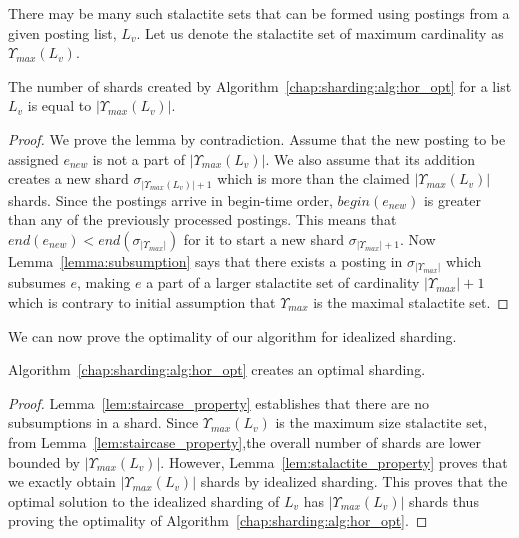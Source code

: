 There may be many such stalactite sets that can be formed using postings from a given posting list, $L_{v}$. Let us denote the stalactite set of maximum cardinality as $\Upsilon_{max}(L_{v})$.

\begin{lemma}
	\label{lem:stalactite_property}
			The number of shards created by Algorithm~\ref{chap:sharding:alg:hor_opt} for a list $L_v$ is equal to $|\Upsilon_{max}(L_v)|$.
\end{lemma}

\begin{proof}{} We prove the lemma by contradiction. Assume that the new posting to be assigned $e_{new}$ is not a part of $|\Upsilon_{max}(L_v)|$. We also assume that its addition creates a new shard $\sigma_{|\Upsilon_{max}(L_v)|+1}$ which is more than the claimed $|\Upsilon_{max}(L_v)|$ shards. Since the postings arrive in begin-time order, $begin(e_{new})$ is greater than any of the previously processed postings. This means that $end(e_{new}) < end(\sigma_{|\Upsilon_{max}|})$ for it to start a new shard $\sigma_{|\Upsilon_{max}|+1}$. Now Lemma~\ref{lemma:subsumption} says that there exists a posting in $\sigma_{|\Upsilon_{max}|}$ which subsumes $e$, making $e$ a part of a larger stalactite set of cardinality $|\Upsilon_{max}|+1$ which is contrary to initial assumption that $\Upsilon_{max}$ is the maximal stalactite set.
\end{proof}

We can now prove the optimality of our algorithm for idealized sharding.
 \label{hor_opt-thm}
\begin{theorem}
  Algorithm~\ref{chap:sharding:alg:hor_opt} creates an optimal sharding.
\end{theorem}

\begin{proof}{}
	Lemma~\ref{lem:staircase_property} establishes that there are no subsumptions in a shard. Since $\Upsilon_{max}(L_v)$ is the maximum size stalactite set, from Lemma~\ref{lem:staircase_property},the overall number of shards are lower bounded by $|\Upsilon_{max}(L_v)|$. However, Lemma~\ref{lem:stalactite_property} proves that we exactly obtain $|\Upsilon_{max}(L_v)|$ shards by idealized sharding. This proves that the optimal solution to the idealized sharding of $L_v$ has $|\Upsilon_{max}(L_v)|$ shards thus proving the optimality of Algorithm~\ref{chap:sharding:alg:hor_opt}.
\end{proof}

